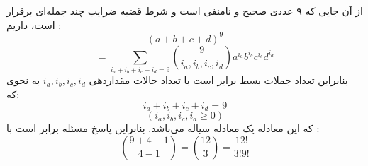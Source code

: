 \p
از آن جایی که ۹ عددی صحیح و نا‌منفی است و شرط قضیه ضرایب چند جمله‌ای برقرار است، داریم :
  $$(a + b + c + d)^9$$
  $$= \sum\limits_{i_a+i_b+i_c+i_d=9} \binom{9}{i_a,i_b,i_c,i_d} a^{i_a} b^{i_b} c^{i_c} d^{i_d}$$
بنابراین تعداد جملات بسط برابر است با تعداد حالات مقداردهی
$i_a,i_b,i_c,i_d$
به نحوی که:
  $$i_a+i_b+i_c+i_d=9$$
  $$(i_a,i_b,i_c,i_d \geq 0)$$
که این معادله یک معادله سیاله می‌باشد. بنابراین پاسخ مسئله برابر است با :
  $$\binom{9 + 4 - 1}{4 - 1} = \binom{12}{3} = \frac{12!}{3!9!}$$